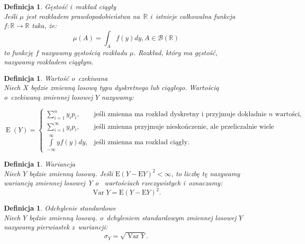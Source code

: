 \documentclass[12pt,a4paper]{report}
\newtheorem{definition}[theorem]{Definicja}
\newcommand{\Ex}{\operatorname{E}}
\newcommand{\Variance}{\operatorname{Var}}
\begin{document}
\begin{definition}{Gęstość i~rozkład ciągły \cite[Rozdział 5.1]{jakubowski2004}}\\
Jeśli $\mu$ jest rozkładem prawdopodobieństwa na~$\mathbb{R}$ i~istnieje całkowalna funkcja $f: \mathbb{R} \rightarrow \mathbb{R}$ taka, że:
$$\mu(A)=\int_A f(y)dy,   A\in \mathcal{B}(\mathbb{R})  $$  %
to funkcję $f$ nazywamy gęstością rozkładu $\mu$. Rozkład, który ma gęstość, nazywamy rozkładem ciągłym. 
\end{definition}



\begin{definition}{Wartość o~czekiwana \cite[Rozdział 2.6]{krysicki1999}}\\
Niech $X$ będzie zmienną losową typu dyskretnego lub ciągłego. Wartością o~czekiwaną zmiennej losowej $Y$ nazywamy:

$$
\Ex (Y)=\left\{ \begin{array}{ll}
\sum\limits_{i=1}^{n} {y_ip_i}, & \textrm{jeśli zmienna ma rozkład dyskretny i~przyjmuje dokładnie $n$ wartości, }\\ 
\sum\limits_{i=1}^{\infty} {y_ip_i}, & \textrm{jeśli zmienna przyjmuje nieskończenie, ale przeliczalnie wiele wartości,}\\
\int\limits_{-\infty}^{\infty} {yf(y)dy}, & \textrm{jeśli zmienna ma rozkład ciągły.}
\end{array} \right.
$$

\end{definition}


\begin{definition}{Wariancja \cite[Rozdział 5.6]{jakubowski2004}}\\
Niech $Y$ będzie zmienną losową. Jeśli $\mathrm{E}(Y-\mathrm{E}Y)^2 < \infty$, to liczbę tę nazywamy wariancją zmiennej losowej Y o~ wartościach rzeczywistych i~oznaczamy: 
$$\Variance Y= \mathrm{E}(Y-\mathrm{E}Y)^2.$$
\end{definition}


\begin{definition}{Odchylenie standardowe \cite[Rozdział 5.6]{jakubowski2004}}\\
Niech $Y$ będzie zmienną losową. o~dchyleniem standardowym zmiennej losowej $Y$ nazywamy pierwiastek z~wariancji:
$$\sigma_Y=\sqrt{\Variance Y}.$$

\end{definition}
\end{document}
